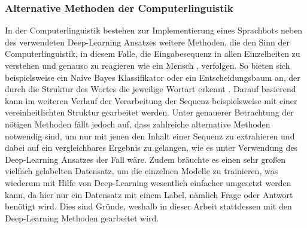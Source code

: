 \documentclass{aa}
\begin{document}
        \subsubsection{Alternative Methoden der Computerlinguistik}
            In der Computerlinguistik bestehen zur Implementierung eines Sprachbots neben des verwendeten Deep-Learning Ansatzes weitere Methoden, die den Sinn der Computerlinguistik, in diesem Falle, die Eingabesequenz in allen Einzelheiten zu verstehen und genauso zu reagieren wie ein Mensch \cite[Vgl.][S.~16]{goyal}, verfolgen. So bieten sich beispielsweise ein Naive Bayes Klassifikator oder ein Entscheidungsbaum an, der durch die Struktur des Wortes die jeweilige Wortart erkennt \cite[Vgl.][S.~245]{bird}. Darauf basierend kann im weiteren Verlauf der Verarbeitung der Sequenz beispielsweise mit einer vereinheitlichten Struktur gearbeitet werden. Unter genauerer Betrachtung der nötigen Methoden fällt jedoch auf, dass zahlreiche alternative Methoden notwendig sind, um nur mit jenen den Inhalt einer Sequenz zu extrahieren und dabei auf ein vergleichbares Ergebnis zu gelangen, wie es unter Verwendung des Deep-Learning Ansatzes der Fall wäre. Zudem bräuchte es einen sehr großen vielfach gelabelten Datensatz, um die einzelnen Modelle zu trainieren, was wiederum mit Hilfe von Deep-Learning wesentlich einfacher umgesetzt werden kann, da hier nur ein Datensatz mit einem Label, nämlich Frage oder Antwort benötigt wird. Dies sind Gründe, weshalb in dieser Arbeit stattdessen mit den Deep-Learning Methoden gearbeitet wird.
\end{document}

